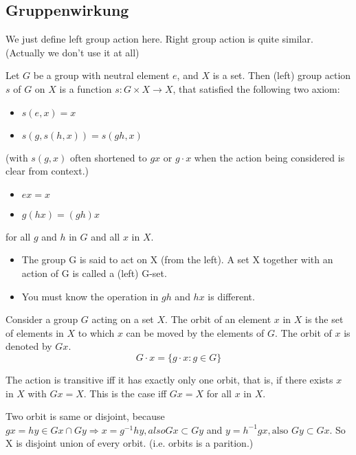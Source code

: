 \subsection{Gruppenwirkung}

We just define left group action here. Right group action is quite similar.(Actually we don't use it at all)
\begin{definition}
    Let $G$ be a group with neutral element $e$, and \(X\) is a set. Then (left) group action $s$ of $G$ on $X$ is a function \(s:G\times X \to X\), that satisfied the following two axiom: 
    \begin{itemize}
        \item $s(e,x) = x$
        \item \(s(g,s(h,x)) = s(gh,x)\)
    \end{itemize}
    (with $s(g,x)$ often shortened to $gx$ or $g\cdot x $ when the action being considered is clear from context.)
    \begin{itemize}
        \item $ex = x$
        \item \(g(hx) = (gh)x\)
    \end{itemize}
    for all $g$ and $h$ in $G$ and all $x$ in $X$.
\end{definition}

\begin{remark}
    \begin{itemize}
        \item The group G is said to act on X (from the left). A set X together with an action of G is called a (left) G-set.
        \item You must know the operation in $gh$ and $hx$ is different.
    \end{itemize}
\end{remark}

\begin{definition}
    Consider a group $G$ acting on a set $X$. The orbit of an element $x$ in $X$ is the set of elements in $X$ to which $x$ can be moved by the elements of $G$. The orbit of $x$ is denoted by $Gx$. $$G\cdot x = \{g\cdot x :g \in G\}$$
\end{definition}

\begin{remark}
    \item  The action is transitive iff it has exactly only one orbit, that is, if there exists $x$ in $X$ with $Gx =X$. This is the case iff $Gx= X$ for all $x$ in $X$.
    \item Two orbit is same or disjoint, because $gx = hy \in Gx\cap Gy\Rightarrow x = g^{-1}hy, also Gx\subset Gy$ and $y = h^{-1}gx, \text{also }  Gy\subset Gx$. So X is disjoint union of every orbit. (i.e. orbits is a parition.)
\end{remark}

